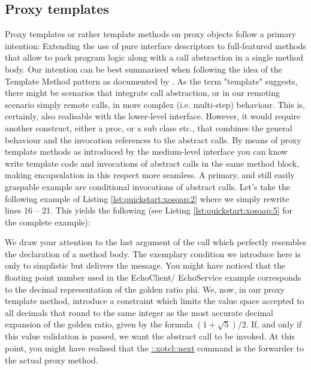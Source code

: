 \subsection{Proxy templates}\label{sec:advanced:template}
Proxy templates or rather template methods on proxy objects follow a primary intention: Extending the 
use of pure interface descriptors to full-featured methods that allow to pack program logic along with a 
call abstraction in a single method body. Our intention can be best summarised when following the idea 
of the Template Method pattern as documented by \cite{gof:1994}. As the term "template" suggests, there 
might be scenarios that integrate call abstraction, or in our remoting scenario simply remote calls, in 
more complex (i.e. multi-step) behaviour. This is, certainly, also realisable with the lower-level interface. 
However, it would require another construct, either a proc, or a sub class etc., that combines the general 
behaviour and the invocation references to the abstract calls. By means of proxy template methods as 
introduced by the medium-level interface you can know write template code and invocations of 
abstract calls in the same method block, making encapsulation in this respect more seamless. A 
primary, and still easily graspable example are conditional invocations of abstract calls. Let's take the 
following example of Listing \ref{lst:quickstart:xosoap:2} where we simply rewrite lines 16 -- 21. This 
yields the following (see Listing \ref{lst:quickstart:xosoap:5} for the complete example): 

We draw your attention to the last argument of the  call which perfectly resembles the declaration of a method body. The exemplary condition we introduce here is only to simplistic but 
delivers the message. You might have noticed that the floating point number used in the EchoClient/
EchoService example corresponds to the decimal representation of the golden ratio phi. We, now, in our 
proxy template method, introduce a constraint which limits the value space accepted to all decimals that 
round to the same integer as the most accurate decimal expansion of the golden ratio, given by the 
formula \begin{math} (1 + \sqrt{5}) / 2\end{math}. If, and only if this value validation is passed, we want 
the abstract call to be invoked. At this point, you might have realised that the \href{http://media.wu-wien.ac.at/doc/tutorial.html#class_method_chaining}{::xotcl::next} command is the 
forwarder to the actual proxy method. 

